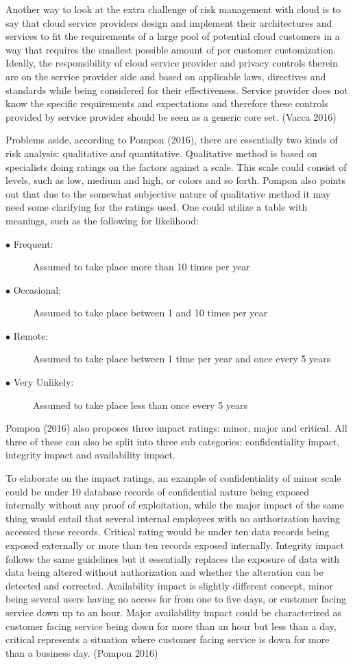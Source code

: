 \documentclass{article}
\begin{document}
Another way to look at the extra challenge of risk management with cloud is to say that cloud service providers design and implement their architectures and services to fit the requirements of a large pool of potential cloud customers in a way that requires the smallest possible amount of per customer customization. Ideally, the responsibility of cloud service provider and privacy controls therein are on the service provider side and based on applicable laws, directives and standards while being considered for their effectiveness. Service provider does not know the specific requirements and expectations and therefore these controls provided by service provider should be seen as a generic core set. (Vacca 2016)
\par
Problems aside, according to Pompon (2016), there are essentially two kinds of risk analysis: qualitative and quantitative. Qualitative method is based on specialists doing ratings on the factors against a scale. This scale could consist of levels, such as low, medium and high, or colors and so forth.
Pompon also points out that due to the somewhat subjective nature of qualitative method it may need some clarifying for the ratings used. One could utilize a table with meanings, such as the following for likelihood:
\begin{description}
	\item[$\bullet$ Frequent:] Assumed to take place more than 10 times per year
	\item[$\bullet$ Occasional:] Assumed to take place between 1 and 10 times per year
	\item[$\bullet$ Remote:] Assumed to take place between 1 time per year and once every 5 years
	\item[$\bullet$ Very Unlikely:] Assumed to take place less than once every 5 years
\end{description}
Pompon (2016) also proposes three impact ratings: minor, major and critical. All three of these can also be split into three sub categories: confidentiality impact, integrity impact and availability impact.
\par
To elaborate on the impact ratings, an example of confidentiality of minor scale could be under 10 database records of confidential nature being exposed internally without any proof of exploitation, while the major impact of the same thing would entail that several internal employees with no authorization having accessed these records. Critical rating would be under ten data records being exposed externally or more than ten records exposed internally. Integrity impact follows the same guidelines but it essentially replaces the exposure of data with data being altered without authorization and whether the alteration can be detected and corrected. Availability impact is slightly different concept, minor being several users having no access for from one to five days, or customer facing service down up to an hour. Major availability impact could be characterized as customer facing service being down for more than an hour but less than a day, critical represents a situation where customer facing service is down for more than a business day. (Pompon 2016) 
\end{document}
